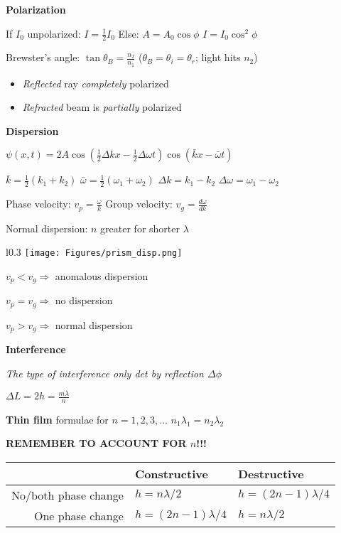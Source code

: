 \documentclass[twocolumn]{article}
\begin{document}
\small

\textbf{Polarization}

If $I_0$ unpolarized: $I = \frac{1}{2} I_0$ \hfill Else: $A = A_0 \cos \phi$ \hspace{1em} $I = I_0 \cos^2 \phi$

Brewster's angle: $\tan \theta_B = \frac{n_2}{n_1}$ \hfill ($\theta_B = \theta_i = \theta_r$; light hits $n_2$) \vspace{-.5em}
\begin{itemize}
    \item \textit{Reflected} ray \textit{completely} polarized
    \item \textit{Refracted} beam is \textit{partially} polarized
\end{itemize} \vspace{-1em}

\dotfill

\textbf{Dispersion}

$\psi(x, t) = 2A \cos \left( \frac{1}{2} \Delta kx - \frac{1}{2} \Delta \omega t \right) \cos( \bar{k}x - \bar{\omega} t)$

$\bar{k} = \frac{1}{2} (k_1 + k_2)$ \hfill $\bar{\omega} = \frac{1}{2} (\omega_1 + \omega_2)$ \hfill $\Delta k = k_1 - k_2$ \hfill $\Delta \omega = \omega_1 - \omega_2$

Phase velocity: $v_p = \frac{\omega}{k}$ \hfill Group velocity: $v_g = \frac{d\omega}{dk}$

Normal dispersion: $n$ greater for shorter $\lambda$

\begin{wrapfigure}[3]{l}{0.3\columnwidth} \vspace{-2em}
    \texttt{[image: Figures/prism\_disp.png]}
\end{wrapfigure}

$v_p < v_g \Rightarrow$ anomalous dispersion

$v_p = v_g \Rightarrow$ no dispersion

$v_p > v_g \Rightarrow$ normal dispersion

\dotfill

\textbf{Interference}

\textit{The type of interference only det by reflection $\Delta \phi$}

$\Delta L = 2h = \frac{m \lambda}{n}$

\textbf{Thin film} formulae for $n = 1, 2, 3, ...$ \hfill $n_1 \lambda_1 = n_2 \lambda_2$

\textbf{REMEMBER TO ACCOUNT FOR $n$!!!} \vspace{-1em}
\begin{table}[h]
    \centering
    \begin{tabular}{rll}
        \hline \hline
        & Constructive & Destructive \\
        \hline
        No/both phase change & $h = n\lambda / 2$ & $h = (2n-1)\lambda/4$ \\
        One phase change & $h = (2n-1)\lambda/4$ & $h = n\lambda / 2$ \\
        \hline \hline
    \end{tabular}
\end{table} \vspace{-1em}
\end{document}
